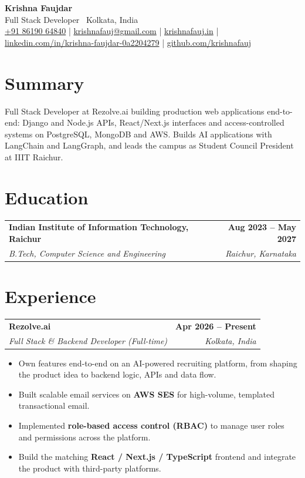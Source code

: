 \documentclass[letterpaper,10pt]{article}
\makeatletter
\newcommand{\entry}[4]{%
  \begin{tabularx}{\linewidth}{@{}X r@{}}
    \textbf{#1} & \textbf{#2} \\
    \textit{\small #3} & \textit{\small\color{muted} #4} \\
  \end{tabularx}\vspace{-3pt}}
\newenvironment{points}{\begin{itemize}[leftmargin=12pt,itemsep=0.5pt,topsep=2pt,parsep=0pt,label={\small\textbullet}]\small}{\end{itemize}\vspace{2pt}}
\makeatother
\begin{document}
\begin{center}
  {\Huge\bfseries Krishna Faujdar}\\[3pt]
  {\small\color{muted} Full Stack Developer \textbullet\ Kolkata, India}\\[3pt]
  \small
  \href{tel:+918619064840}{+91 86190 64840} \;|\;
  \href{mailto:krishnafauj@gmail.com}{krishnafauj@gmail.com} \;|\;
  \href{https://krishnafauj.in}{krishnafauj.in} \;|\;
  \href{https://linkedin.com/in/krishna-faujdar-0a2204279}{linkedin.com/in/krishna-faujdar-0a2204279} \;|\;
  \href{https://github.com/krishnafauj}{github.com/krishnafauj}
\end{center}
\vspace{-4pt}

\section{Summary}
\small Full Stack Developer at Rezolve.ai building production web applications end-to-end: Django and Node.js APIs, React/Next.js interfaces and access-controlled systems on PostgreSQL, MongoDB and AWS. Builds AI applications with LangChain and LangGraph, and leads the campus as Student Council President at IIIT Raichur.

\section{Education}
\entry{Indian Institute of Information Technology, Raichur}{Aug 2023 -- May 2027}{B.Tech, Computer Science and Engineering}{Raichur, Karnataka}

\section{Experience}
\entry{Rezolve.ai}{Apr 2026 -- Present}{Full Stack \& Backend Developer (Full-time)}{Kolkata, India}
\begin{points}
  \item Own features end-to-end on an AI-powered recruiting platform, from shaping the product idea to backend logic, APIs and data flow.
  \item Built scalable email services on \textbf{AWS SES} for high-volume, templated transactional email.
  \item Implemented \textbf{role-based access control (RBAC)} to manage user roles and permissions across the platform.
  \item Build the matching \textbf{React / Next.js / TypeScript} frontend and integrate the product with third-party platforms.
\end{points}
\end{document}
